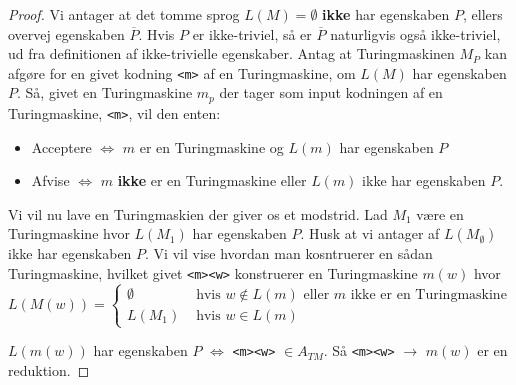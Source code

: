 \begin{proof}
	Vi antager at det tomme sprog $L(M) = \emptyset$ \textbf{ikke} har egenskaben $P$, ellers overvej egenskaben $\overline{P}$. Hvis $P$ er ikke-triviel, så er $\overline{P}$ naturligvis også ikke-triviel, ud fra definitionen af ikke-trivielle egenskaber.
	Antag at Turingmaskinen $M_{P}$ kan afgøre for en givet kodning \texttt{<m>} af en Turingmaskine, om $L(M)$ har egenskaben $P$. Så, givet en Turingmaskine $m_{p}$ der tager som input kodningen af en Turingmaskine, \texttt{<m>}, vil den enten:
	\begin{itemize}
		\item Acceptere $\iff$  $m$ er en Turingmaskine og $L(m)$ har egenskaben $P$
		\item Afvise $\iff$ $m$ \textbf{ikke} er en Turingmaskine eller $L(m)$ ikke har egenskaben $P$.
	\end{itemize}

	Vi vil nu lave en Turingmaskien der giver os et modstrid. Lad $M_{1}$ være en Turingmaskine hvor $L(M_{1})$ har egenskaben $P$. Husk at  vi antager af $L(M_{\emptyset})$ ikke har egenskaben $P$. Vi vil vise hvordan man kosntruerer en sådan Turingmaskine, hvilket givet \texttt{<m><w>} konstruerer en Turingmaskine $m(w)$ hvor
	\begin{equation*}
		L(M(w)) = \begin{cases}
			\emptyset & \text{ hvis } w \notin L(m) \text{ eller } m \text{ ikke er en Turingmaskine} \\
			L(M_{1})  & \text{ hvis } w \in L(m)
		\end{cases}
	\end{equation*}

	$L(m(w))$ har egenskaben $P$ $\iff$ \texttt{<m><w>} $\in A_{TM}$. Så \texttt{<m><w>} $\rightarrow$ $m(w)$ er en reduktion.
\end{proof}



